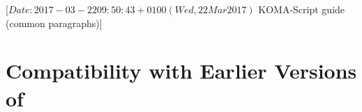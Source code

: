 %
%
%
%
%
%
%
%
% 
%
%
%
%

                 [$Date: 2017-03-22 09:50:43 +0100 (Wed, 22 Mar 2017) $
                  KOMA-Script guide (common paragraphs)]


\section{Compatibility with Earlier Versions of \KOMAScript}
\BeginIndexGroup
{}

